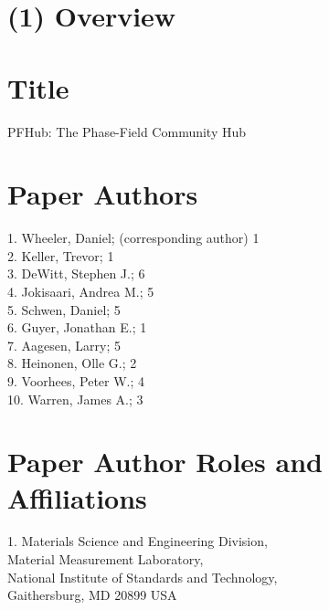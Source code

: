 \documentclass{jors}
\begin{document}




\section*{(1) Overview}

\vspace{0.5cm}

\section*{Title}

PFHub: The Phase-Field Community Hub

\section*{Paper Authors}

1. Wheeler, Daniel; (corresponding author) 1\\
2. Keller, Trevor; 1\\
3. DeWitt, Stephen J.; 6\\
4. Jokisaari, Andrea M.; 5\\
5. Schwen, Daniel; 5\\
6. Guyer, Jonathan E.; 1\\
7. Aagesen, Larry; 5\\
8. Heinonen, Olle G.; 2\\
9. Voorhees, Peter W.; 4\\
10. Warren, James A.; 3

\section*{Paper Author Roles and Affiliations}

1. Materials Science and Engineering Division, \\
Material Measurement Laboratory, \\
National Institute of Standards and Technology,\\
Gaithersburg, MD 20899 USA
\end{document}
